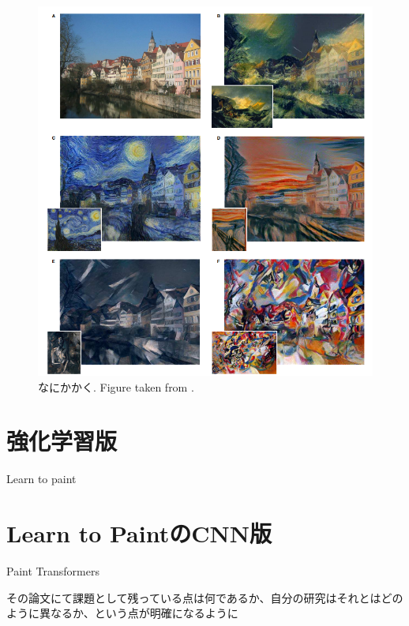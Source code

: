 \begin{figure}
    \centering
    \includegraphics[width=150truemm]{resources/3_related_work/outputs_IST.png}
    \caption{
      なにかかく. Figure taken from
      \cite{Gatys_2016_CVPR}. 
    }
    \label{output_IST}
\end{figure}
\clearpage

\section{強化学習版}
Learn to paint \cite{Huang_2019_ICCV} 
\section{Learn to PaintのCNN版}
Paint Transformers \cite{liu2021paint}

その論文にて課題として残っている点は何であるか、自分の研究はそれとはどのように異なるか、という点が明確になるように
